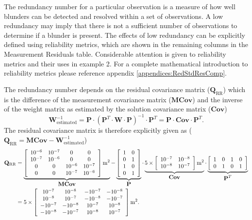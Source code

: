 The redundancy number for a particular observation is a measure of how well blunders can be detected and resolved within a set of observations.  A low redundancy may imply that there is not a sufficient number of observations to determine if a blunder is present. The effects of low redundancy can be explicitly defined using reliability metrics, which are shown in the remaining columns in the Measurement Residuals table. Considerable attention is given to reliability metrics and their uses in example 2. For a complete mathematical introduction to reliability metrics please reference appendix \ref{appendices:RedStdResComp}. 

The redundancy number depends on the residual covariance matrix ($\mathbf{Q}_{\text{RR}}$) which is the difference of the measurement covariance matrix ($\mathbf{MCov}$) and the inverse of the weight matrix as estimated by the solution covariance matrix ($\mathbf{Cov}$)
\begin{equation}
\mathbf{W}^{-1}_{\text{estimated}}=\mathbf{P}\cdot(\mathbf{P}^T\cdot\mathbf{W}\cdot\mathbf{P})^{-1}\cdot\mathbf{P}^T=\mathbf{P}\cdot\mathbf{Cov}\cdot\mathbf{P}^T.
\end{equation}
The residual covariance matrix is therefore explicitly given as ($\mathbf{Q}_{\text{RR}}=\mathbf{MCov}-\mathbf{W}_{\text{estimated}}^{-1}$)
\begin{equation}
\begin{split}
\mathbf{Q}_{\text{RR}} &= \mathop{\underbrace{\left[\begin{array}{cccc}10^{-6}&10^{-7}&0&0\\10^{-7}&10^{-6}&0&0\\0&0&10^{-6}&10^{-7}\\0&0&10^{-7}&10^{-6}\end{array}\right]\text{m}^2}_{\displaystyle{\mathbf{MCov}}}}-\mathop{\underbrace{\left[\begin{array}{cc}1&0\\0&1\\1&0\\0&1\end{array}\right]}_{\displaystyle{\mathbf{P}}}}\cdot\mathop{\underbrace{5\times\left[\begin{array}{cc}10^{-7}&10^{-8}\\10^{-8}&10^{-7}\end{array}\right]\text{m}^2}_{\displaystyle{\mathbf{Cov}}}}\cdot\mathop{\underbrace{\left[\begin{array}{cccc}1&0&1&0\\0&1&0&1\end{array}\right]}_{\displaystyle{\mathbf{P}^T}}} \\
&= 5\times\left[\begin{array}{cccc}10^{-7}&10^{-8}&-10^{-7}&-10^{-8}\\10^{-8}&10^{-7}&-10^{-8}&-10^{-7}\\-10^{-7}&-10^{-8}&10^{-7}&10^{-8}\\-10^{-8}&-10^{-7}&10^{-8}&10^{-7}\end{array}\right]\text{m}^2.
\end{split}
\end{equation}
